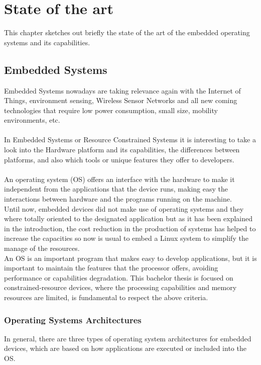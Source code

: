 \chapter{State of the art}\label{C:State-Art}
This chapter sketches out briefly the state of the art of the embedded operating systems and its capabilities.

\section{Embedded Systems}\label{S:SOTA-Embedded-Systems}
Embedded Systems nowadays are taking relevance again with the Internet of Things, environment sensing, Wireless Sensor Networks and all new coming technologies that require low power consumption, small size, mobility environments, etc.
\\
\\
In Embedded Systems or Resource Constrained Systems it is interesting to take a look into the Hardware platform and its capabilities, the differences between platforms, and also which tools or unique features they offer to developers.
\\
\\
An operating system (OS) offers an interface with the hardware to make it independent from the applications that the device runs, making easy the interactions between hardware and the programs running on the machine.
\\
Until now, embedded devices did not make use of operating systems and they where totally oriented to the designated application but as it has been explained in the introduction, the cost reduction in the production of systems has helped to increase the capacities so now is usual to embed a Linux system to simplify the manage of the resources.
\\
An OS is an important program that makes easy to develop applications, but it is important to maintain the features that the processor offers, avoiding performance or capabilities degradation. 
This bachelor thesis is focused on constrained-resource devices, where the processing capabilities and memory resources are limited, is fundamental to respect the above criteria.

\subsection{Operating Systems Architectures}\label{SOTA-Operating-Systems-Architectures}
In general, there are three types of operating system architectures for embedded devices, which are based on how applications are executed or included into the OS.

